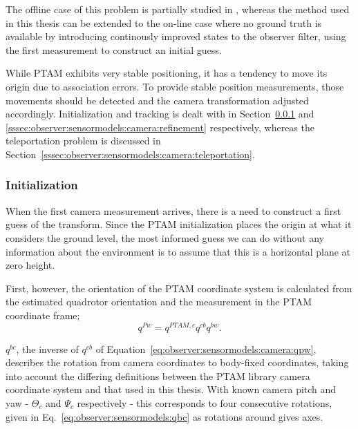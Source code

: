     The offline case of this problem is partially studied in \citep{hayashi2010},
    whereas the method used in this thesis can be extended to the on-line
    case where no ground truth is available by introducing continously improved
    states to the observer filter, using the first measurement to construct
    an initial guess.

    While PTAM exhibits very stable positioning, it has a tendency to move
    its origin due to association errors. To provide stable position
    measurements, those movements should be detected and the
    camera transformation adjusted accordingly.
    Initialization and tracking is dealt with in
    Section~\ref{sssec:observer:sensormodels:camera:initialization} and \ref{sssec:observer:sensormodels:camera:refinement}
    respectively, whereas the teleportation problem is discussed in
    Section~\ref{sssec:observer:sensormodels:camera:teleportation}.

    \subsubsection{Initialization}
        \label{sssec:observer:sensormodels:camera:initialization}
        When the first camera measurement arrives, there is a need to construct a
        first guess of the transform. Since the PTAM initialization places
        the origin at what it considers the ground level, the most informed
        guess we can do without any information about the environment is
        to assume that this is a horizontal plane at zero height.

        First, however, the orientation of the PTAM coordinate system is calculated
        from the estimated quadrotor orientation and the measurement in the
        PTAM coordinate frame;
        \begin{equation}
            \label{eq:observer:sensormodels:camera:qpw}
            q^{Pw} = q^{PTAM,c} q^{cb} q^{bw}.
        \end{equation}

        $q^{bc}$, the inverse of $q^{cb}$ of Equation~\ref{eq:observer:sensormodels:camera:qpw},
        describes the rotation from camera coordinates to body-fixed coordinates, taking
        into account the differing definitions between the PTAM library
        camera coordinate system and that used in this thesis.
        With known camera pitch and yaw - $\Theta_{c}$ and $\Psi_{c}$ respectively -
        this  corresponds to four consecutive rotations, given in
        Eq.~\eqref{eq:observer:sensormodels:qbc} as rotations around gives axes.

